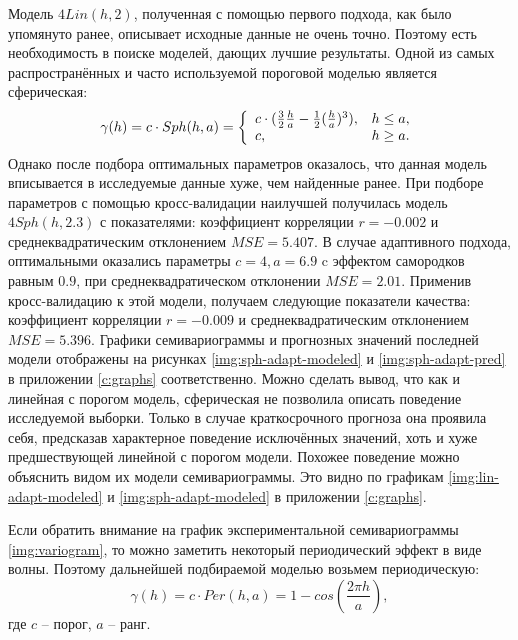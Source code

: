 Модель $ 4 Lin(h, 2) $, полученная с помощью первого подхода, как было упомянуто ранее, описывает исходные данные не очень точно. Поэтому есть необходимость в поиске моделей, дающих лучшие результаты. Одной из самых распространённых и часто используемой пороговой моделью является сферическая:
\begin{equation*}
	\gamma(h) = c \cdot Sph(h, a) = \left\{
		\begin{array}{l l}
			c \cdot (\frac{3}{2} \frac{h}{a} - \frac{1}{2}(\frac{h}{a})^3), & h \le a, \\
			c, & h \geq a.
		\end{array} \right.
\end{equation*}
Однако после подбора оптимальных параметров оказалось, что данная модель вписывается в исследуемые данные хуже, чем найденные ранее. При подборе параметров с помощью кросс-валидации наилучшей получилась модель $ 4 Sph(h, 2.3) $ с показателями: коэффициент корреляции $ r = -0.002$ и среднеквадратическим отклонением $ MSE = 5.407$. В случае адаптивного подхода, оптимальными оказались параметры $ c = 4, a = 6.9 $ c эффектом самородков равным $ 0.9 $, при среднеквадратическом отклонении $ MSE = 2.01 $. Применив кросс-валидацию к этой модели, получаем следующие показатели качества: коэффициент корреляции $ r = -0.009 $ и среднеквадратическим отклонением $ MSE = 5.396 $. Графики семивариограммы и прогнозных значений последней модели отображены на рисунках \ref{img:sph-adapt-modeled} и \ref{img:sph-adapt-pred} в приложении \ref{c:graphs} соответственно. Можно сделать вывод, что как и линейная с порогом модель, сферическая не позволила описать поведение исследуемой выборки. Только в случае краткосрочного прогноза она проявила себя, предсказав характерное поведение исключённых значений, хоть и хуже предшествующей линейной с порогом модели. Похожее поведение можно объяснить видом их модели семивариограммы. Это видно по графикам \ref{img:lin-adapt-modeled} и \ref{img:sph-adapt-modeled} в приложении \ref{c:graphs}.

Если обратить внимание на график экспериментальной семивариограммы \ref{img:variogram}, то можно заметить некоторый периодический эффект в виде волны. Поэтому дальнейшей подбираемой моделью возьмем периодическую:
\begin{equation*}
	\gamma(h) = c \cdot Per(h, a) = 1 - cos(\frac{2 \pi h}{a}),
\end{equation*}
где $ c $ -- порог, $ a $ -- ранг.

